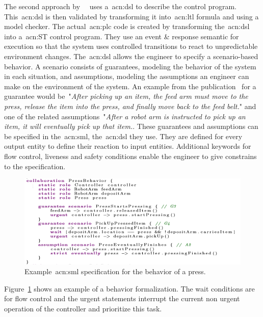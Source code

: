 The second approach by~\citeauthor{10.1007/978-3-319-74730-9_23}~\cite{10.1007/978-3-319-74730-9_23} uses a~\acrfull{acn:dsl} to describe the control program.
This~\acrshort{acn:dsl} is then validated by transforming it into~\acrshort{acn:ltl} formula and using a model checker.
The actual~\acrshort{acn:plc} code is created by transforming the~\acrshort{acn:dsl} into a~\acrshort{acn:ST} control program.
They use an event \& response semantic for execution so that the system uses controlled transitions to react to unpredictable environment changes.
The~\acrshort{acn:dsl} allows the engineer to specify a scenario-based behavior.
A scenario consists of guarantees, modeling the behavior of the system in each situation, and assumptions, modeling the assumptions an engineer can make on the environment of the system.
An example from the publication~\cite{10.1007/978-3-319-74730-9_23} for a guarantee would be~"\textit{After picking up an item, the feed arm must move to the press, release the item into the press, and finally move back to the feed belt.}" and one of the related assumptions~"\textit{After a robot arm is instructed to pick up an item, it will eventually pick up that item.}.
These guarantees and assumptions can be specified in the~\acrfull{acn:sml}, the~\acrshort{acn:dsl} they use.
They are defined for every output entity to define their reaction to input entities.
Additional keywords for flow control, liveness and safety conditions enable the engineer to give constrains to the specification.
\begin{figure}[h]
	\centering
	\includegraphics[width=\textwidth]{./Figures/sml_press_beh.png}
	\caption[\acrshort{acn:sml} specification example.]{Example~\acrshort{acn:sml} specification for the behavior of a press.~\cite{10.1007/978-3-319-74730-9_23}}
	\label{fig:sml_press}
\end{figure}
Figure~\ref{fig:sml_press} shows an example of a behavior formalization.
The wait conditions are for flow control and the urgent statements interrupt the current non urgent operation of the controller and prioritize this task.
